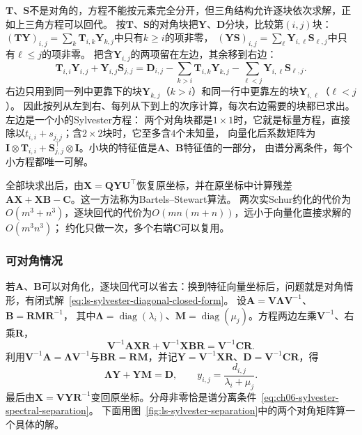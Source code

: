 $\bm T$、$\bm S$不是对角的，方程不能按元素完全分开，但三角结构允许逐块依次求解，正如上三角方程可以回代。
按$\bm T$、$\bm S$的对角块把$\bm Y$、$\bm D$分块，比较第$(i,j)$块：
$(\bm T\bm Y)_{i,j}=\sum_k\bm T_{i,k}\bm Y_{k,j}$中只有$k\geq i$的项非零，
$(\bm Y\bm S)_{i,j}=\sum_\ell\bm Y_{i,\ell}\bm S_{\ell,j}$中只有$\ell\leq j$的项非零。
把含$\bm Y_{i,j}$的两项留在左边，其余移到右边：
\begin{equation}
 \bm T_{i,i}\bm Y_{i,j}+\bm Y_{i,j}\bm S_{j,j}
 =\bm D_{i,j}-\sum_{k>i}\bm T_{i,k}\bm Y_{k,j}
          -\sum_{\ell<j}\bm Y_{i,\ell}\bm S_{\ell,j}.
 \label{eq:ls-sylvester-block-recurrence}
\end{equation}
右边只用到同一列中更靠下的块$\bm Y_{k,j}$（$k>i$）和同一行中更靠左的块$\bm Y_{i,\ell}$（$\ell<j$）。
因此按列从左到右、每列从下到上的次序计算，每次右边需要的块都已求出。左边是一个小的Sylvester方程：
两个对角块都是$1\times1$时，它就是标量方程，直接除以$t_{i,i}+s_{j,j}$；含$2\times2$块时，它至多含$4$个未知量，
向量化后系数矩阵为$\bm I\otimes\bm T_{i,i}+\bm S_{j,j}^\top\otimes\bm I$。小块的特征值是$\bm A$、$\bm B$特征值的一部分，
由谱分离条件，每个小方程都唯一可解。

全部块求出后，由$\bm X=\bm Q\bm Y\bm U^\top$恢复原坐标，并在原坐标中计算残差$\bm A\bm X+\bm X\bm B-\bm C$。这一方法称为Bartels--Stewart算法。
两次实Schur约化的代价为$O(m^3+n^3)$，逐块回代的代价为$O(mn(m+n))$，远小于向量化直接求解的$O(m^3n^3)$；
约化只做一次，多个右端$\bm C$可以复用。

\subsubsection{可对角情况}
\label{sec:ls-sylvester-diagonalizable}

若$\bm A$、$\bm B$可以对角化，逐块回代可以省去：换到特征向量坐标后，问题就是对角情形，有闭式解~\eqref{eq:ls-sylvester-diagonal-closed-form}。
设$\bm A=\bm V\bm\Lambda\bm V^{-1}$、$\bm B=\bm R\bm M\bm R^{-1}$，
其中$\bm\Lambda=\operatorname{diag}(\lambda_i)$、$\bm M=\operatorname{diag}(\mu_j)$。方程两边左乘$\bm V^{-1}$、右乘$\bm R$，
\[
 \bm V^{-1}\bm A\bm X\bm R+\bm V^{-1}\bm X\bm B\bm R=\bm V^{-1}\bm C\bm R .
\]
利用$\bm V^{-1}\bm A=\bm\Lambda\bm V^{-1}$与$\bm B\bm R=\bm R\bm M$，并记$\bm Y=\bm V^{-1}\bm X\bm R$、$\bm D=\bm V^{-1}\bm C\bm R$，得
\begin{equation}
 \bm\Lambda\bm Y+\bm Y\bm M=\bm D,
 \qquad
 y_{i,j}=\frac{d_{i,j}}{\lambda_i+\mu_j}.
 \label{eq:ls-sylvester-diagonalized}
\end{equation}
最后由$\bm X=\bm V\bm Y\bm R^{-1}$变回原坐标。分母非零恰是谱分离条件~\eqref{eq:ch06-sylvester-spectral-separation}。
下面用图~\ref{fig:ls-sylvester-separation}中的两个对角矩阵算一个具体的解。

